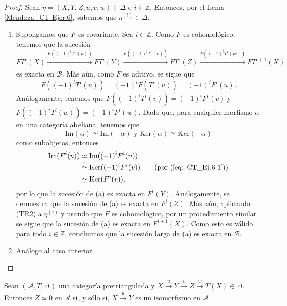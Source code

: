 \documentclass[tesis]{subfiles}
\begin{document}
\begin{proof}

    Sean $\eta=(X,Y,Z,u,v,w)\in\Delta$ e $i\in\mathbb{Z}$. Entonces, por el Lema \ref{Mendoza_CT-Ejer.6}, sabemos que $\eta^{(i)}\in\Delta$.

    \begin{enumerate}[label=(\alph*)]
    
        \item Supongamos que $F$ es covariante. Sea $i\in\mathbb{Z}$. Como $F$ es cohomológico, tenemos que la sucesión
            \begin{equation}\label{eq: CT_Ej.6-1}
                    FT^i(X) \xrightarrow[]{F((-1)^i T^i(u))} FT^i(Y) \xrightarrow[]{F((-1)^i T^i(v))} FT^i(Z) \xrightarrow[]{F((-1)^i T^i(w))} FT^{i+1}(X)
            \end{equation}
            es exacta en $\mathscr{B}$. Más aún, como $F$ es aditivo, se sigue que
            \[
                F((-1)^iT^i(u)) = (-1)^iF(T^i(u)) = (-1)^iF^i(u).
            \]
            Análogamente, tenemos que $F((-1)^iT^i(v)) = (-1)^i F^i(v)$ y $F((-1)^iT^i(w)) = (-1)^i F^i(w)$. Dado que, para cualquier morfismo $\alpha$ en una categoría abeliana, tenemos que
            \[
                \text{Im}(\alpha)\simeq\text{Im}(-\alpha) \text{ y } \text{Ker}(\alpha)\simeq\text{Ker}(-\alpha)
            \] 
            como subobjetos, entonces
            \begin{align*}
                \text{Im}(F^i(u)) &\simeq \text{Im}( (-1)^iF^i(u) ) \\
                                          &\simeq \text{Ker}( (-1)^iF^i(v) ) \tag{por (\ref{eq: CT_Ej.6-1})} \\
                                          &\simeq \text{Ker}(F^i(v)),
            \end{align*}
            por lo que la sucesión de (a) es exacta en $F^i(Y)$. Análogamente, se demuestra que la sucesión de (a) es exacta en $F^i(Z)$. Más aún, aplicando (TR2) a $\eta^{(i)}$ y usando que $F$ es cohomológico, por un procedimiento similar se sigue que la sucesión de (a) es exacta en $F^{i+1}(X)$. Como esto es válido para todo $i\in\mathbb{Z}$, concluimos que la sucesión larga de (a) es exacta en $\mathscr{B}$.

        \item Análogo al caso anterior.
    \end{enumerate}
\end{proof}

\begin{Prop}\label{Mendoza_CT-1.4}
    Sean $(\mathscr{A},T,\Delta)$ una categoría pretriangulada y $X\xrightarrow[]{u}Y\xrightarrow[]{v}Z\xrightarrow[]{w}T(X)\in\Delta$. Entonces $Z\simeq0$ en $\mathscr{A}$ si, y sólo si, $X\xrightarrow[]{u}Y$ es un isomorfismo en $\mathscr{A}$.
\end{Prop}
\end{document}
